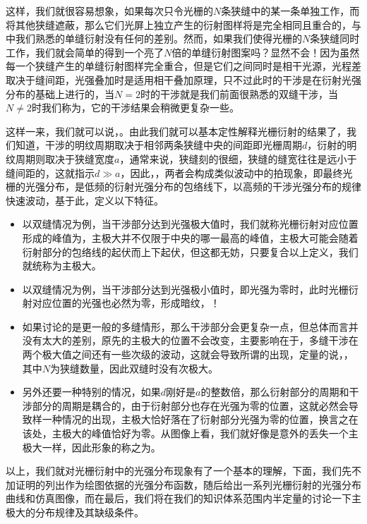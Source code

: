 这样，我们就很容易想象，如果每次只令光栅的$N$条狭缝中的某一条单独工作，而将其他狭缝遮蔽，那么它们光屏上独立产生的衍射图样将是完全相同且重合的，与中我们熟悉的单缝衍射没有任何的差别。然而，如果我们使得光栅的$N$条狭缝同时工作，我们就会简单的得到一个亮了$N$倍的单缝衍射图案吗？显然不会！因为虽然每一个狭缝产生的单缝衍射图样完全重合，但是它们之间同时是相干光源，光程差取决于缝间距，光强叠加时是适用相干叠加原理，只不过此时的干涉是在衍射光强分布的基础上进行的，当$N=2$时的干涉就是我们前面很熟悉的双缝干涉，当$N\neq 2$时我们称为，它的干涉结果会稍微更复杂一些。

这样一来，我们就可以说，。由此我们就可以基本定性解释光栅衍射的结果了，我们知道，干涉的明纹周期取决于相邻两条狭缝中央的间距即光栅周期$d$，衍射的明纹周期则取决于狭缝宽度$a$，通常来说，狭缝刻的很细，狭缝的缝宽往往是远小于缝间距的，这就指示$d\gg a$，因此，，两者会构成类似波动中的拍现象，即最终光栅的光强分布，是低频的衍射光强分布的包络线下，以高频的干涉光强分布的规律快速波动，基于此，定义以下特征。
\begin{itemize}
    \item 以双缝情况为例，当干涉部分达到光强极大值时，我们就称光栅衍射对应位置形成的峰值为，主极大并不仅限于中央的哪一最高的峰值，主极大可能会随着衍射部分的包络线的起伏而上下起伏，但这都无妨，只要复合以上定义，我们就统称为主极大。
    \item 以双缝情况为例，当干涉部分达到光强极小值时，即光强为零时，此时光栅衍射对应位置的光强也必然为零，形成暗纹，！
    \item 如果讨论的是更一般的多缝情形，那么干涉部分会更复杂一点，但总体而言并没有太大的差别，原先的主极大的位置不会改变，主要影响在于，多缝干涉在两个极大值之间还有一些次级的波动，这就会导致所谓的出现，定量的说，，其中$N$为狭缝数量，因此双缝时没有次极大。
    \item 另外还要一种特别的情况，如果$d$刚好是$a$的整数倍，那么衍射部分的周期和干涉部分的周期是耦合的，由于衍射部分也存在光强为零的位置，这就必然会导致样一种情况的出现，主极大恰好落在了衍射部分光强为零的位置，换言之在该处，主极大的峰值恰好为零。从图像上看，我们就好像是意外的丢失一个主极大一样，因此形象的称之为。
\end{itemize}
以上，我们就对光栅衍射中的光强分布现象有了一个基本的理解，下面，我们先不加证明的列出作为绘图依据的光强分布函数，随后给出一系列光栅衍射的光强分布曲线和仿真图像，而在最后，我们将在我们的知识体系范围内半定量的讨论一下主极大的分布规律及其缺级条件。

